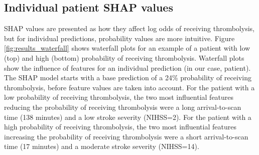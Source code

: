 \subsection{Individual patient SHAP values}
SHAP values are presented as how they affect log odds of receiving thrombolysis, but for individual predictions, probability values are more intuitive. Figure \ref{fig:results_waterfall} shows waterfall plots for an example of a patient with low (top) and high (bottom) probability of receiving thrombolysis. Waterfall plots show the influence of features for an individual prediction (in our case, patient). The SHAP model starts with a base prediction of a 24\% probability of receiving thrombolysis, before feature values are taken into account. For the patient with a low probability of receiving thrombolysis, the two most influential features reducing the probability of receiving thrombolysis were a long arrival-to-scan time (138 minutes) and a low stroke severity (NIHSS=2). For the patient with a high probability of receiving thrombolysis, the two most influential features increasing the probability of receiving thrombolysis were a short arrival-to-scan time (17 minutes) and a moderate stroke severity (NIHSS=14). 

